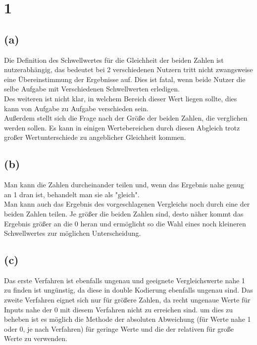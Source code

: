 \documentclass[a4paper]{scrartcl}
\title{\titleinfo}
\author{Tronje Krabbe 6435002, The-Vinh Jackie Huynh 6388888,\\Arne Struck 6326505}
\date{\today}
\begin{document}
\maketitle
\notag

\section{1}
	\subsection{(a)}
		Die Definition des Schwellwertes für die Gleichheit der beiden Zahlen ist nutzerabhängig, das 
		bedeutet bei 2 verschiedenen Nutzern tritt nicht zwangsweise eine Übereinstimmung der 
		Ergebnisse auf. Dies ist fatal, wenn beide Nutzer die selbe Aufgabe mit Verschiedenen 
		Schwellwerten erledigen. \\
		Des weiteren ist nicht klar, in welchem Bereich dieser Wert liegen sollte, dies kann von 
		Aufgabe zu Aufgabe verschieden sein. \\
		Außerdem stellt sich die Frage nach der Größe der beiden Zahlen, die verglichen werden 
		sollen. Es kann in einigen Wertebereichen durch diesen Abgleich trotz großer Wertunterschiede 
		zu angeblicher Gleichheit kommen.
		
	\subsection{(b)}
		Man kann die Zahlen durcheinander teilen und, wenn das Ergebnis nahe genug an 1 dran ist, 
		behandelt man sie als "gleich". \\
		Man kann auch das Ergebnis des vorgeschlagenen Vergleichs noch durch eine der beiden Zahlen 
		teilen. Je größer die beiden Zahlen sind, desto näher kommt das Ergebnis größer an die 0 
		heran und ermöglicht so die Wahl eines noch kleineren Schwellwertes zur möglichen 
		Unterscheidung.

	\subsection{(c)}
		Das erste Verfahren ist ebenfalls ungenau und geeignete Vergleichswerte 
		nahe 1 zu finden ist ungünstig, da diese in double Kodierung ebenfalls ungenau sind.
		Das zweite Verfahren eignet sich nur für größere Zahlen, da recht ungenaue Werte für Inputs 
		nahe der 0 mit diesem Verfahren nicht zu erreichen sind.
		um dies zu beheben ist es möglich die Methode der absoluten Abweichung (für Werte nahe 1 oder 
		0, je nach Verfahren) für geringe Werte und die der relativen für große Werte zu verwenden.
		
\end{document}

